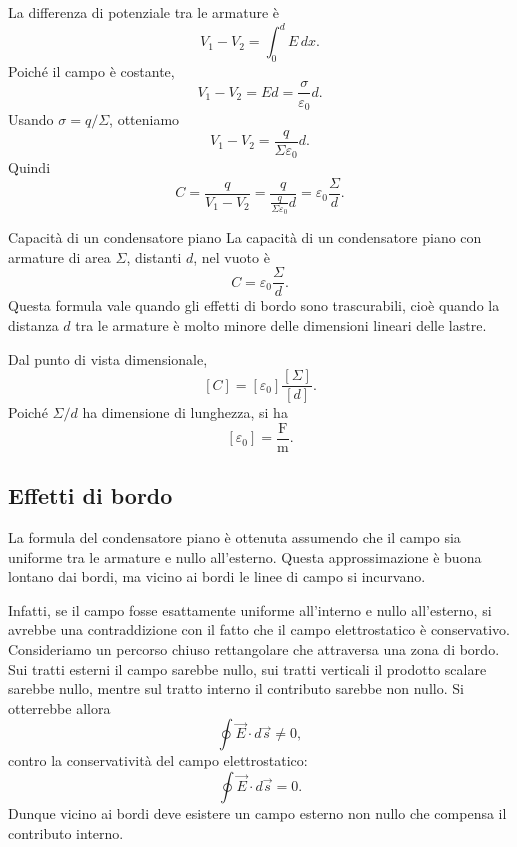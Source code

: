 \documentclass[a4paper]{article}
\begin{document}
La differenza di potenziale tra le armature è
\[
    V_1-V_2=\int_0^d E\,dx.
\]
Poiché il campo è costante,
\[
    V_1-V_2=Ed=\frac{\sigma}{\varepsilon_0}d.
\]
Usando \(\sigma=q/\Sigma\), otteniamo
\[
    V_1-V_2=\frac{q}{\Sigma\varepsilon_0}d.
\]
Quindi
\[
    C=\frac{q}{V_1-V_2}=\frac{q}{\frac{q}{\Sigma\varepsilon_0}d}
    =\varepsilon_0\frac{\Sigma}{d}.
\]

\begin{snippettheorem}{Capacità di un condensatore piano}
    La capacità di un condensatore piano con armature di area \(\Sigma\), distanti \(d\), nel vuoto è
    \[
        C=\varepsilon_0\frac{\Sigma}{d}.
    \]
    Questa formula vale quando gli effetti di bordo sono trascurabili, cioè quando la distanza \(d\) tra le armature è molto minore delle dimensioni lineari delle lastre.
\end{snippettheorem}

Dal punto di vista dimensionale,
\[
    [C]=[\varepsilon_0]\frac{[\Sigma]}{[d]}.
\]
Poiché \(\Sigma/d\) ha dimensione di lunghezza, si ha
\[
    [\varepsilon_0]=\frac{\mathrm{F}}{\mathrm{m}}.
\]

\subsection{Effetti di bordo}

La formula del condensatore piano è ottenuta assumendo che il campo sia uniforme tra le armature e nullo all'esterno. Questa approssimazione è buona lontano dai bordi, ma vicino ai bordi le linee di campo si incurvano.

\begin{center}
\end{center}

Infatti, se il campo fosse esattamente uniforme all'interno e nullo all'esterno, si avrebbe una contraddizione con il fatto che il campo elettrostatico è conservativo. Consideriamo un percorso chiuso rettangolare che attraversa una zona di bordo. Sui tratti esterni il campo sarebbe nullo, sui tratti verticali il prodotto scalare sarebbe nullo, mentre sul tratto interno il contributo sarebbe non nullo. Si otterrebbe allora
\[
    \oint \vec{E}\cdot d\vec{s}\neq 0,
\]
contro la conservatività del campo elettrostatico:
\[
    \oint \vec{E}\cdot d\vec{s}=0.
\]
Dunque vicino ai bordi deve esistere un campo esterno non nullo che compensa il contributo interno.
\end{document}
